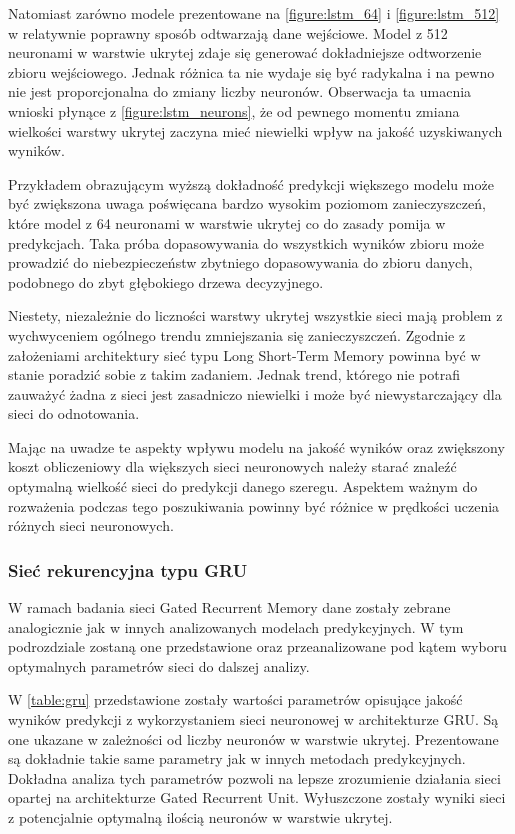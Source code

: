 \documentclass[10pt,a4paper]{article}
\begin{document}
Natomiast zarówno modele prezentowane na \autoref{figure:lstm_64} i \autoref{figure:lstm_512} w relatywnie poprawny sposób odtwarzają dane wejściowe. Model z 512 neuronami w warstwie ukrytej zdaje się generować dokładniejsze odtworzenie zbioru wejściowego. Jednak różnica ta nie wydaje się być radykalna i na pewno nie jest proporcjonalna do zmiany liczby neuronów. Obserwacja ta umacnia wnioski płynące z \autoref{figure:lstm_neurons}, że od pewnego momentu zmiana wielkości warstwy ukrytej zaczyna mieć niewielki wpływ na jakość uzyskiwanych wyników. 

Przykładem obrazującym wyższą dokładność predykcji większego modelu może być zwiększona uwaga poświęcana bardzo wysokim poziomom zanieczyszczeń, które model z 64 neuronami w warstwie ukrytej co do zasady pomija w predykcjach. Taka próba dopasowywania do wszystkich wyników zbioru może prowadzić do niebezpieczeństw zbytniego dopasowywania do zbioru danych, podobnego do zbyt głębokiego drzewa decyzyjnego.

Niestety, niezależnie do liczności warstwy ukrytej wszystkie sieci mają problem z wychwyceniem ogólnego trendu zmniejszania się zanieczyszczeń. Zgodnie z założeniami architektury sieć typu Long Short-Term Memory powinna być w stanie poradzić sobie z takim zadaniem. Jednak trend, którego nie potrafi zauważyć żadna z sieci jest zasadniczo niewielki i może być niewystarczający dla sieci do odnotowania. 

Mając na uwadze te aspekty wpływu modelu na jakość wyników oraz zwiększony koszt obliczeniowy dla większych sieci neuronowych należy starać znaleźć optymalną wielkość sieci do predykcji danego szeregu. Aspektem ważnym do rozważenia podczas tego poszukiwania powinny być różnice w prędkości uczenia różnych sieci neuronowych.

\subsubsection{Sieć rekurencyjna typu GRU}
\label{subsection:results:GRU}
W ramach badania sieci Gated Recurrent Memory dane zostały zebrane analogicznie jak w innych analizowanych modelach predykcyjnych. W tym podrozdziale zostaną one przedstawione oraz przeanalizowane pod kątem wyboru optymalnych parametrów sieci do dalszej analizy. 

W \autoref{table:gru} przedstawione zostały wartości parametrów opisujące jakość wyników predykcji z wykorzystaniem sieci neuronowej w architekturze GRU. Są one ukazane w zależności od liczby neuronów w warstwie ukrytej. Prezentowane są dokładnie takie same parametry jak w innych metodach predykcyjnych. Dokładna analiza tych parametrów pozwoli na lepsze zrozumienie działania sieci opartej na architekturze Gated Recurrent Unit. Wyłuszczone zostały wyniki sieci z potencjalnie optymalną ilością neuronów w warstwie ukrytej. 
\end{document}
